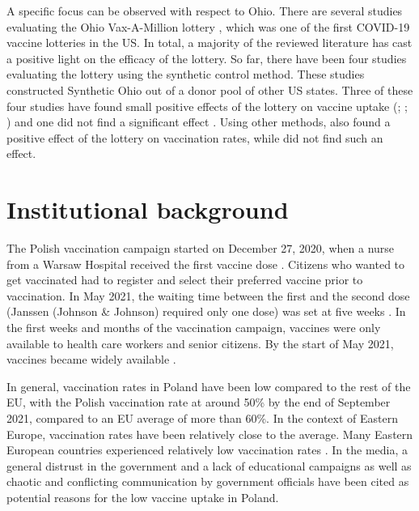 \documentclass{scrbook}
\begin{document}
A specific focus can be observed with respect to Ohio. There are several
studies evaluating the Ohio Vax-A-Million lottery
\parencite{ohio_department_of_health_ohio_2021}, which was one of the
first COVID-19 vaccine lotteries in the US. In total, a majority of the
reviewed literature has cast a positive light on the efficacy of the
lottery. So far, there have been four studies evaluating the lottery
using the synthetic control method. These studies constructed Synthetic
Ohio out of a donor pool of other US states. Three of these four studies
have found small positive effects of the lottery on vaccine uptake
(\cite{brehm_ohio_2022}; \cite{barber_conditional_2022};
\cite{sehgal_impact_2021}) and one did not find a significant effect
\parencite{lang_did_2022}. Using other methods,
\textcite{mallow_covid-19_2022} also found a positive effect of the
lottery on vaccination rates, while \textcite{walkey_lottery-based_2021}
did not find such an effect.

\section{Institutional background}

The Polish vaccination campaign started on December 27, 2020, when a
nurse from a Warsaw Hospital received the first vaccine dose
\parencite{waligora_how_2021}. Citizens who wanted to get vaccinated had
to register and select their preferred vaccine prior to vaccination. In
May 2021, the waiting time between the first and the second dose
(Janssen (Johnson \& Johnson) required only one dose) was set at five
weeks \parencite{service_of_the_republic_of_poland_changes_2021}. In the
first weeks and months of the vaccination campaign, vaccines were only
available to health care workers and senior citizens. By the start of
May 2021, vaccines became widely available
\parencite{koschalka_poland_2021}.

In general, vaccination rates in Poland have been low compared to the
rest of the EU, with the Polish vaccination rate at around 50\% by the
end of September 2021, compared to an EU average of more than 60\%. In
the context of Eastern Europe, vaccination rates have been relatively
close to the average. Many Eastern European countries experienced
relatively low vaccination rates \parencite{mathieu_global_2021}. In the
media, a general distrust in the government and a lack of educational
campaigns \parencite{vaccines_today_polands_2021} as well as chaotic and
conflicting communication by government officials
\parencite{wanat_polands_2021} have been cited as potential reasons for
the low vaccine uptake in Poland.
\end{document}

